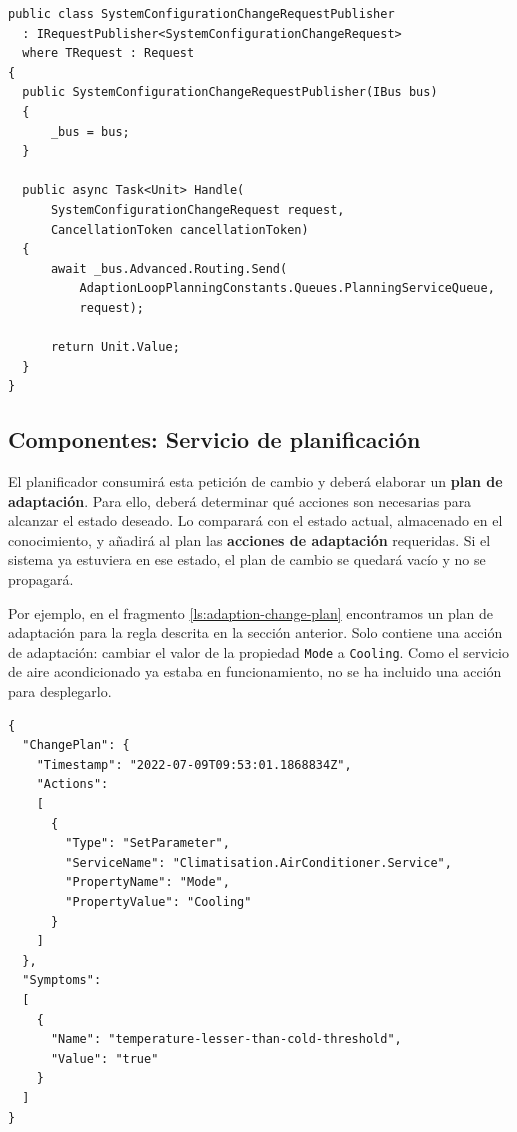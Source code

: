 \begin{lstlisting}[caption={Las peticiones asíncronas se publican a una cola determinada.\protect\footnotemark},captionpos=b, label=ls:request-publisher]
public class SystemConfigurationChangeRequestPublisher
  : IRequestPublisher<SystemConfigurationChangeRequest>
  where TRequest : Request
{
  public SystemConfigurationChangeRequestPublisher(IBus bus)
  {
      _bus = bus;
  }

  public async Task<Unit> Handle(
      SystemConfigurationChangeRequest request,
      CancellationToken cancellationToken)
  {
      await _bus.Advanced.Routing.Send(
          AdaptionLoopPlanningConstants.Queues.PlanningServiceQueue,
          request);

      return Unit.Value;
  }
}
\end{lstlisting}


\subsection{Componentes: Servicio de planificación}

El planificador consumirá esta petición de cambio y deberá elaborar un \textbf{plan de adaptación}. Para ello, deberá determinar qué acciones son necesarias para alcanzar el estado deseado. Lo comparará con el estado actual, almacenado en el conocimiento, y añadirá al plan las \textbf{acciones de adaptación} requeridas. Si el sistema ya estuviera en ese estado, el plan de cambio se quedará vacío y no se propagará.

Por ejemplo, en el fragmento \ref{ls:adaption-change-plan} encontramos un plan de adaptación para la regla descrita en la sección anterior. Solo contiene una acción de adaptación: cambiar el valor de la propiedad \texttt{Mode} a \texttt{Cooling}. Como el servicio de aire acondicionado ya estaba en funcionamiento, no se ha incluido una acción para desplegarlo.

\begin{lstlisting}[style=json,caption={Plan de adaptación generado para la regla anterior. Solo contiene una acción de adaptación: cambiar la configuración \texttt{Mode} del servicio \texttt{AirConditioner}.},captionpos=b, label=ls:adaption-change-plan]
{
  "ChangePlan": {
    "Timestamp": "2022-07-09T09:53:01.1868834Z",
    "Actions":
    [
      {
        "Type": "SetParameter",
        "ServiceName": "Climatisation.AirConditioner.Service",
        "PropertyName": "Mode",
        "PropertyValue": "Cooling"
      }
    ]
  },
  "Symptoms":
  [
    {
      "Name": "temperature-lesser-than-cold-threshold",
      "Value": "true"
    }
  ]
}
\end{lstlisting}

